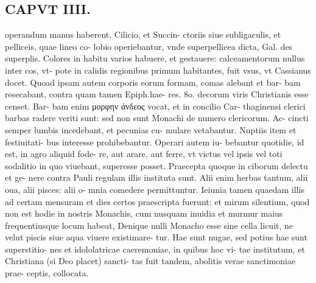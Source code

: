 \documentclass{article}
\begin{document}
\begin{pages}
\section*{CAPVT  IIII. }
\marginpar{[ p.221 ]}\pstart operandum manus haberent, Cilicio, et Succin- ctoriis siue subligaculis, et pelliceis, quae lineo co- lobio operiebantur, vnde superpellicea dicta, Gal. des superplis. Colores in habitu varios habuere, et gestauere: calceamentorum nullus inter cos, vt- pote in calidis regionibus primum habitantes, fuit vsus, vt Cassianus docet. Quoad ipsam autem corporis eorum formam, comas alebant et bar- bam resecabant, contra quam tamen Epiph.hae- res. 8o. decorum viris Christianis esse censet. Bar- bam enim μορφην ἀνδεος vocat, et in concilio Car- thaginensi clerici barbas radere veriti sunt: sed non sunt Monachi de numero clericorum. Ac- cincti semper lumbis incedebant, et pecunias cu- mulare vetabantur. Nuptiis item et festiuitati- bus interesse prohibebantur. Operari autem iu- bebantur quotidie, id est, in agro aliquid fode- re, aut arare, aut ferre, vt victus vel ipsis vel toti sodalitio in quo viuebant, superesse posset. Praecepta quoque in ciborum delectu et ge- nere contra Pauli regulam illis instituta sunt. Alii enim herbas tantum, alii oua, alii pisces: alii o- mnia comedere permittuntur. Ieiunia tamen quaedam illis ad certam mensuram et dies certos praescripta fuerunt: et mirum silentium, quod non est hodie in nostris Monachis, cum nusquam inuidia et murmur maius frequentiusque locum habeat, Denique nulli Monacho esse sine cella licuit, ne velut piscis siue aqua viuere existimare- tur. Hae sunt nugae, sed potius hae sunt superstitio- nes et idololatricae caeremoniae, in quibus hoc vi- tae institutum, et Christiana (si Deo placet) sancti- tas fuit tandem, abolitis verae sanctimoniae prae- ceptis, collocata.  \pend

\end{pages}
\end{document}
